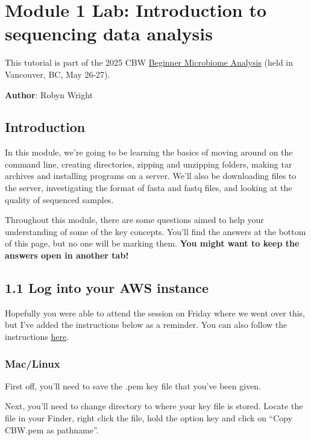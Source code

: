 \documentclass[
]{book}
\begin{document}
\chapter{Module 1 Lab: Introduction to sequencing data analysis}\label{module-1-lab-introduction-to-sequencing-data-analysis}

This tutorial is part of the 2025 CBW \href{https://bioinformaticsdotca.github.io/BMB_2025/}{Beginner Microbiome Analysis} (held in Vancouver, BC, May 26-27).

\textbf{Author}: Robyn Wright

\section{Introduction}\label{introduction}

In this module, we're going to be learning the basics of moving around on the command line, creating directories, zipping and unzipping folders, making tar archives and installing programs on a server. We'll also be downloading files to the server, investigating the format of fasta and fastq files, and looking at the quality of sequenced samples.

Throughout this module, there are some questions aimed to help your understanding of some of the key concepts. You'll find the answers at the bottom of this page, but no one will be marking them. \textbf{You might want to keep the answers open in another tab!}

\section{1.1 Log into your AWS instance}\label{log-into-your-aws-instance}

Hopefully you were able to attend the session on Friday where we went over this, but I've added the instructions below as a reminder. You can also follow the instructions \href{https://github.com/bioinformaticsdotca/AWS_stuff/blob/master/Logging_into_the_Amazon_cloud.md}{here}.

\subsection{Mac/Linux}\label{maclinux}

First off, you'll need to save the .pem key file that you've been given.

Next, you'll need to change directory to where your key file is stored. Locate the file in your Finder, right click the file, hold the option key and click on ``Copy CBW.pem as pathname''.
\end{document}
